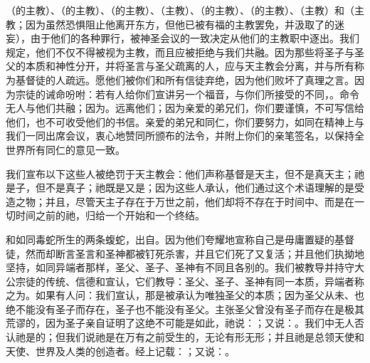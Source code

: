 （的主教）、（的主教）、（的主教）、（主教）、（的主教）、（的主教）、（主教）和（主教；因为虽然恐惧阻止他离开东方，但他已被有福的主教罢免，并汲取了的迷妄），由于他们的各种罪行，被神圣会议的一致决定从他们的主教职中逐出。我们规定，他们不仅不得被视为主教，而且应被拒绝与我们共融。因为那些将圣子与圣父的本质和神性分开，并将圣言与圣父疏离的人，应与天主教会分离，并与所有称为基督徒的人疏远。愿他们被你们和所有信徒弃绝，因为他们败坏了真理之言。因为宗徒的诫命吩咐：若有人给你们宣讲另一个福音，与你们所接受的不同，。命令无人与他们共融；因为。远离他们；因为亲爱的弟兄们，你们要谨慎，不可写信给他们，也不可收受他们的书信。亲爱的弟兄和同仁，你们要努力，如同在精神上与我们一同出席会议，衷心地赞同所颁布的法令，并附上你们的亲笔签名，以保持全世界所有同仁的意见一致。\par

我们宣布以下这些人被绝罚于天主教会：他们声称基督是天主，但不是真天主；祂是子，但不是真子；祂既是又是；因为这些人承认，他们通过这个术语理解的是受造之物；并且，尽管天主子存在于万世之前，他们却将不存在于时间中、而是在一切时间之前的祂，归给一个开始和一个终结。\par

和如同毒蛇所生的两条蝮蛇，出自。因为他们夸耀地宣称自己是毋庸置疑的基督徒，然而却断言圣言和圣神都被钉死杀害，并且它们死了又复活；并且他们执拗地坚持，如同异端者那样，圣父、圣子、圣神有不同且各别的。我们被教导并持守大公宗徒的传统、信德和宣认，它们教导：圣父、圣子、圣神有同一本质，异端者称之为。如果有人问：我们宣认，那是被承认为唯独圣父的本质；因为圣父从未、也绝不能没有圣子而存在，圣子也不能没有圣父。主张圣父曾没有圣子而存在是极其荒谬的，因为圣子亲自证明了这绝不可能是如此，祂说：；又说：。我们中无人否认祂是的；但我们说祂是在万有之前受生的，无论有形无形；并且祂是总领天使和天使、世界及人类的创造者。经上记载：；又说：。\par

